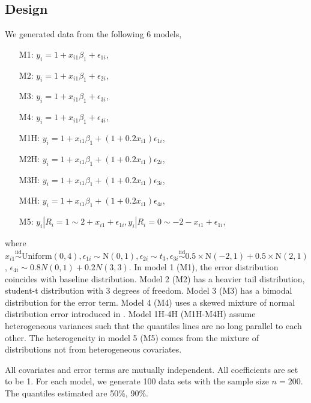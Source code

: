 \documentclass[12pt]{article}
\begin{document}
\subsection{Design}
We generated data from the following 6 models,
\begin{itemize}
\item [M1:] $y_i = 1 + x_{i1}\beta_1 + \epsilon_{1i}$,
\item [M2:] $y_i = 1 + x_{i1}\beta_1 + \epsilon_{2i}$,
\item [M3:] $y_i = 1 + x_{i1}\beta_1 + \epsilon_{3i}$,
\item [M4:] $y_i = 1 + x_{i1}\beta_1 + \epsilon_{4i}$,
\item [M1H:] $y_i = 1 + x_{i1}\beta_1 + (1 + 0.2x_{i1})
  \epsilon_{1i}$,
\item [M2H:] $y_i = 1 + x_{i1}\beta_1 + (1 + 0.2x_{i1})
  \epsilon_{2i}$,
\item [M3H:] $y_i = 1 + x_{i1}\beta_1 + (1 + 0.2x_{i1})
  \epsilon_{3i}$,
\item [M4H:] $y_i = 1 + x_{i1}\beta_1 + (1 + 0.2x_{i1})
  \epsilon_{4i}$,
\item [M5:] $y_{i} | R_i = 1 \sim 2 + x_{i1} + \epsilon_{1i}, y_{i}|
  R_i = 0 \sim -2 - x_{i1} + \epsilon_{1i}$,
\end{itemize}
where $x_{i1} \stackrel{\mbox{iid}}{\sim} \mathrm{Uniform}(0,4),
\epsilon_{1i} \sim \mathrm{N}(0,1), \epsilon_{2i} \sim t_3,
\epsilon_{3i} \stackrel{\mbox{iid}}{\sim} 0.5 \times \mathrm{N}(-2,1)
+ 0.5 \times \mathrm{N}(2,1)$, $\epsilon_{4i} \sim 0.8 N(0,1) + 0.2
N(3,3)$. In model 1 (M1), the
error distribution coincides with baseline distribution. Model 2 (M2)
has a heavier tail distribution, student-t distribution with 3 degrees
of freedom. Model 3 (M3) has a bimodal distribution for the error
term.  Model 4 (M4) uses a skewed mixture of normal distribution error
introduced in \citet{reich2010}. Model 1H-4H (M1H-M4H) assume
heterogeneous variances such that the quantiles lines are no long
parallel to each other. The heterogeneity in model 5 (M5)
 comes from the mixture of distributions
not from heterogeneous covariates.

All covariates and error terms are mutually independent. All
coefficients are set to be 1. For each model, we generate 100 data
sets with the sample size $n=200$. The quantiles estimated are 50\%,
90\%.
\end{document}
